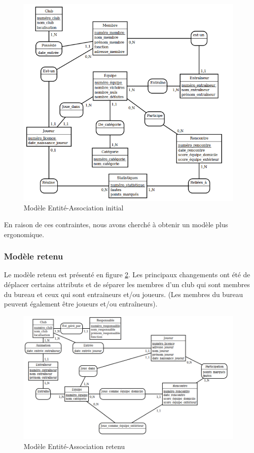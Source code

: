 \documentclass[a4paper,12pt]{article}
\begin{document}
\begin{figure}[!h]
\centering
\includegraphics[scale=0.6]{init.png}
\caption{Modèle Entité-Association initial\label{EAinit}}
\end{figure}

En raison de ces contraintes, nous avons cherché à obtenir un modèle plus ergonomique.
\subsubsection{Modèle retenu}
Le modèle retenu est présenté en figure \ref{EAretenu}. Les principaux changements ont été de déplacer certains attributs et de séparer les membres d'un club qui sont membres du bureau et ceux qui sont entraineurs et/ou joueurs. (Les membres du bureau peuvent également être joueurs et/ou entraîneurs).

\begin{figure}[!h]
\begin{minipage}{.96\linewidth}
\centering
\includegraphics[scale=0.6]{modeleea.png}
\caption{Modèle Entité-Association retenu\label{EAretenu}}
\end{minipage}
\end{figure}
\end{document}
